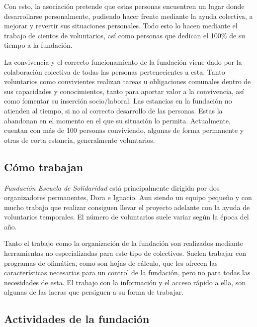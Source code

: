 Con esto, la asociación pretende que estas personas encuentren un lugar donde desarrollarse personalmente, pudiendo hacer frente mediante la ayuda colectiva, a mejorar y revertir sus situaciones personales. Todo esto lo hacen mediante el trabajo de cientos de voluntarios, así como personas que dedican el 100\% de su tiempo a la fundación.

La convivencia y el correcto funcionamiento de la fundación viene dado por la colaboración colectiva de todas las personas pertenecientes a esta. Tanto voluntarios como convivientes realizan tareas u obligaciones comunales dentro de sus capacidades y conocimientos, tanto para aportar valor a la convivencia, así como fomentar su inserción socio/laboral. Las estancias en la fundación no atienden al tiempo, si no al correcto desarrollo de las personas. Estas la abandonan en el momento en el que su situación lo permita. Actualmente, cuentan con más de 100 personas conviviendo, algunas de forma permanente y otras de corta estancia, generalmente voluntarios.

\subsection{Cómo trabajan}

\textit{Fundación Escuela de Solidaridad} está principalmente dirigida por dos organizadores permanentes, Dora e Ignacio. Aun siendo un equipo pequeño y con mucho trabajo que realizar consiguen llevar el proyecto adelante con la ayuda de voluntarios temporales. El número de voluntarios suele variar según la época del año.

Tanto el trabajo como la organización de la fundación son realizados mediante herramientas no especializadas para este tipo de colectivos. Suelen trabajar con programas de ofimática, como son hojas de cálculo, que les ofrecen las características necesarias para un control de la fundación, pero no para todas las necesidades de esta. El trabajo con la información y el acceso rápido a ella, son algunas de las lacras que persiguen a su forma de trabajar.

\subsection{Actividades de la fundación}

